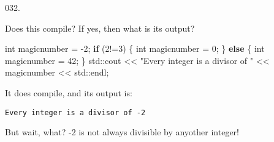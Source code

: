 \documentclass[]{book}
\newenvironment{Shaded}{}{}
\newcommand{\BuiltInTok}[1]{#1}
\newcommand{\ControlFlowTok}[1]{\textcolor[rgb]{0.00,0.44,0.13}{\textbf{#1}}}
\newcommand{\DataTypeTok}[1]{\textcolor[rgb]{0.56,0.13,0.00}{#1}}
\newcommand{\DecValTok}[1]{\textcolor[rgb]{0.25,0.63,0.44}{#1}}
\newcommand{\NormalTok}[1]{#1}
\newcommand{\StringTok}[1]{\textcolor[rgb]{0.25,0.44,0.63}{#1}}
\begin{document}
\begin{minipage}{\linewidth}\noindent
{\tiny 032.}\\
\begin{minipage}[t]{.485\linewidth}

Does this compile? If yes, then what is its output?

\begin{framed}

\begin{Shaded}
\begin{Highlighting}[]
\DataTypeTok{int}\NormalTok{ magicnumber = }\DecValTok{-2}\NormalTok{;}
\ControlFlowTok{if}\NormalTok{ (}\DecValTok{2}\NormalTok{!=}\DecValTok{3}\NormalTok{) \{}
  \DataTypeTok{int}\NormalTok{ magicnumber = }\DecValTok{0}\NormalTok{;}
\NormalTok{\} }\ControlFlowTok{else}\NormalTok{ \{}
  \DataTypeTok{int}\NormalTok{ magicnumber = }\DecValTok{42}\NormalTok{;}
\NormalTok{\}}
\BuiltInTok{std::}\NormalTok{cout << }\StringTok{"Every integer is a divisor of "}
\NormalTok{          << magicnumber << }\BuiltInTok{std::}\NormalTok{endl;}
\end{Highlighting}
\end{Shaded}

\end{framed}

It does compile, and its output is:

\end{minipage}
\hfill
\begin{minipage}[t]{.485\linewidth}

\begin{framed}

\begin{verbatim}
Every integer is a divisor of -2
\end{verbatim}

\end{framed}

But wait, what? -2 is not always divisible by anyother integer!

\end{minipage}
\end{minipage}

\vspace{2mm}\noindent\hrulefill{}
\end{document}
